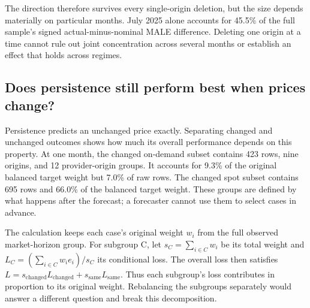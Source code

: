 \documentclass[10pt]{article}
\begin{document}
The direction therefore survives every single-origin deletion, but the size depends materially on particular months. July 2025 alone accounts for 45.5\% of the full sample's signed actual-minus-nominal MALE difference. Deleting one origin at a time cannot rule out joint concentration across several months or establish an effect that holds across regimes.

\begin{table}[H]
\centering\small

\caption{Timing sensitivity when one observed origin is omitted. Each run removes that origin's complete paired comparison and averages the remaining origin losses equally. The minimum and maximum are relative error reductions, not confidence bounds. Unscored calendar months are not deletion runs. All 94 defined results remain positive, but the runs are dependent diagnostics. Individual runs and retained-case counts are available in the repository.}
\label{tab:table6}
\end{table}

\subsection{Does persistence still perform best when prices change?}

Persistence predicts an unchanged price exactly. Separating changed and unchanged outcomes shows how much its overall performance depends on this property. At one month, the changed on-demand subset contains 423 rows, nine origins, and 12 provider-origin groups. It accounts for 9.3\% of the original balanced target weight but 7.0\% of raw rows. The changed spot subset contains 695 rows and 66.0\% of the balanced target weight. These groups are defined by what happens after the forecast; a forecaster cannot use them to select cases in advance.

The calculation keeps each case's original weight $w_i$ from the full observed market-horizon group. For subgroup C, let $s_C=\sum_{i\in C}w_i$ be its total weight and $L_C=(\sum_{i\in C}w_i e_i)/s_C$ its conditional loss. The overall loss then satisfies $L=s_{\mathrm{changed}}L_{\mathrm{changed}}+s_{\mathrm{same}}L_{\mathrm{same}}$. Thus each subgroup's loss contributes in proportion to its original weight. Rebalancing the subgroups separately would answer a different question and break this decomposition.

\begin{table}[H]
\centering\small

\caption{One-month conditional MALE using the original observed-group weights. OD means on-demand. Frequency-shrunk trend is the separate exploratory benchmark defined in Section 6.4. Each conditional loss is divided by its subgroup's total weight; the two groups are not treated as equally large. Same denotes unchanged prices.}
\label{tab:table7}
\end{table}
\end{document}
